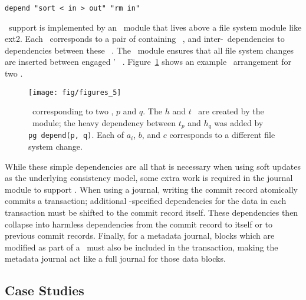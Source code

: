 \vspace{-0.5\baselineskip}
\begin{center}
\begin{small}
\verb+depend "sort < in > out" "rm in"+
\end{small}
\end{center}
\vspace{-0.5\baselineskip}


\Patchgroup\ support is implemented by an \LFS\ module that lives above a file
system module like ext2.
%
Each \patchgroup\ corresponds to a pair of containing \noop\ \patches,
and inter-\patchgroup\ dependencies to dependencies between these \noop\
\patches.
%
The \LFS\ module ensures that all file system changes are inserted
between engaged \patchgroups' \noop\ \patches.
%
Figure~\ref{fig:patchgroup-patches} shows an example \patch\ arrangement for
two \patchgroups.

\begin{figure}[t]
\centering
\texttt{[image: fig/figures\_5]}
\caption{\label{fig:patchgroup-patches} \Patches\ corresponding to two
  \patchgroups, $p$ and $q$.  The $h$ and $t$ \patches\ are created by the 
  \patchgroup\ module; the heavy dependency between $t_p$ and $h_q$ was added
  by \texttt{pg~depend(p, q)}.  Each of $a_i$, $b$, and $c$ corresponds to
  a different file system change.}
\end{figure}

While these simple dependencies are all that is necessary when using soft
updates as the underlying consistency model, some extra work is required in the
journal module to support \patchgroups.
%
When using a journal, writing the commit record atomically commits a
transaction; additional \patchgroup-specified dependencies for the data in each
transaction must be shifted to the commit record itself.
%
These dependencies then collapse into harmless dependencies from the commit
record to itself or to previous commit records.
%
Finally, for a metadata journal, blocks which are modified as part of a
\patchgroup\ must also be included in the transaction, making the metadata
journal act like a full journal for those data blocks.

\subsection{Case Studies}
\label{sec:patchgroup:casestudies}

